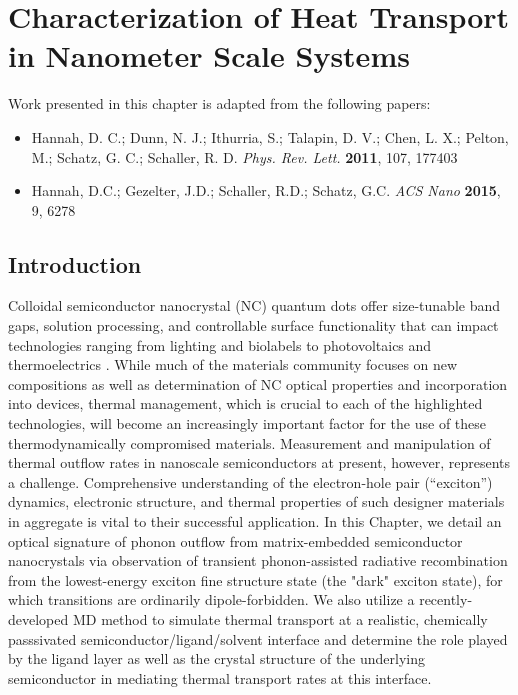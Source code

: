 \chapter{Characterization of Heat Transport in Nanometer Scale Systems}

Work presented in this chapter is adapted from the following papers:

\begin{itemize}
\item Hannah, D. C.; Dunn, N. J.; Ithurria, S.; Talapin, D. V.; Chen, L. X.; Pelton, M.; Schatz, G. C.; Schaller, R. D. \emph{Phys. Rev. Lett.} \textbf{2011}, 107, 177403

\item Hannah, D.C.; Gezelter, J.D.; Schaller, R.D.; Schatz, G.C. \emph{ACS Nano} \textbf{2015}, 9, 6278
\end{itemize}
\section{Introduction}

Colloidal semiconductor nanocrystal (NC) quantum dots offer size-tunable band gaps, solution processing, and controllable surface functionality that can impact technologies ranging from lighting \cite{doi:10.1021/nl9002969} and biolabels \cite{doi:10.1146/annurev.bioeng.7.060804.100432} to photovoltaics \cite{Huynh29032002} and thermoelectrics \cite{Hsu06022004, Talapin07102005}.  While much of the materials community focuses on new compositions as well as determination of NC optical properties and incorporation into devices, thermal management, which is crucial to each of the highlighted technologies, will become an increasingly important factor for the use of these thermodynamically compromised materials. Measurement and manipulation of thermal outflow rates in nanoscale semiconductors at present, however, represents a challenge. Comprehensive understanding of the electron-hole pair (“exciton”) dynamics, electronic structure, and thermal properties of such designer materials in aggregate is vital to their successful application.  In this Chapter, we detail an optical signature of phonon outflow from matrix-embedded semiconductor nanocrystals via observation of transient phonon-assisted radiative recombination from the lowest-energy exciton fine structure state (the "dark" exciton state), for which transitions are ordinarily dipole-forbidden. We also utilize a recently-developed MD method to simulate thermal transport at a realistic, chemically passsivated semiconductor/ligand/solvent interface and determine the role played by the ligand layer as well as the crystal structure of the underlying semiconductor in mediating thermal transport rates at this interface.

